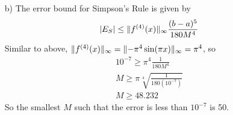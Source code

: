 \documentclass[letterpaper,12pt]{article} %
\begin{document}
\begin{enumerate}
{\begin{enumerate}
      \item[b)] {
        The error bound for Simpson's Rule is given by\cite{errorbound}
        \[ |E_S| \leq \lVert f^{(4)}(x)\rVert_\infty \frac{(b-a)^5}{180M^4} \]
        Similar to above, \( \lVert f^{(4)}(x)\rVert_\infty = \lVert-\pi^4 \sin(\pi x)\rVert_\infty = \pi^4 \), so 
        \begin{gather*}
          10^{-7} \geq \pi^4 \frac{1}{180M^4} \\
          M \geq \pi\sqrt[4]{\frac{1}{180(10^{-7})}} \\
          M \geq 48.232
        \end{gather*}
        So the smallest \(M\) such that the error is less than \(10^{-7}\) is 50.
      }
    \end{enumerate}
  }

\end{enumerate}

\medskip
\printbibliography
\end{document}
